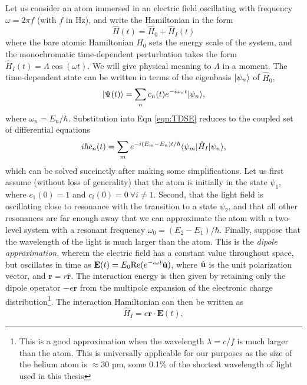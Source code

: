	Let us consider an atom immersed in an electric field oscillating with frequency $\omega = 2 \pi f$ (with $f$ in Hz), and write the Hamiltonian in the form
	\begin{equation}
		\hat{H}(t) = \hat{H}_0 + \hat{H}_{I}(t)
	\end{equation}
	where the bare atomic Hamiltonian $H_0$ sets the energy scale of the system, and the monochromatic time-dependent perturbation takes the form $\hat{H}_I(t) = \Lambda \cos(\omega t)$.
	We will give physical meaning to $\Lambda$ in a moment.
	The time-dependent state can be written in terms of the eigenbasis $|\psi_n\rangle$ of $\hat{H}_0$,
	\begin{equation}
		|\Psi(t)\rangle = \sum_n c_n(t)e^{-i\omega_n t}|\psi_n\rangle,
	\end{equation}
	where $\omega_n= E_n/\hbar$.
	Substitution into Eqn \ref{eqn:TDSE} reduces to the coupled set of differential equations 
	\begin{equation}
		i\hbar\dot{c}_n(t) = \sum_m e^{-i(E_m-E_n)t/\hbar}\langle\psi_m|\hat{H}_I|\psi_n\rangle,
	\end{equation} 
	which can be solved succinctly after making some simplifications.
	Let us first assume (without loss of generality) that the atom is initially in the state $\psi_1$, where $c_1(0)=1$ and $c_i(0)=0~\forall i\neq1$.
	Second, that the light field is oscillating close to resonance with the transition to a state $\psi_2$, and that all other resonances are far enough away that we can approximate the atom with a two-level system with a resonant frequency $\omega_0 =(E_2-E_1)/\hbar$.
	Finally, suppose that the wavelength of the light is much larger than the atom. 
	This is the \emph{dipole approximation}, wherein the electric field has a constant value throughout space, but oscillates in time as $\textbf{E}(t) = {E}_0 \textrm{Re}(e^{-i\omega t}\hat{\mathbf{u}})$, where $\hat{\mathbf{u}}$ is the unit polarization vector, and $\textbf{r} = r\hat{\textbf{r}}$.
	The interaction energy is then given by retaining only the dipole operator $-e\textbf{r}$ from the multipole expansion of the electronic charge distribution\footnote{This is a good approximation when the wavelength $\lambda = c/f$ is much larger than the atom. This is universally applicable for our purposes as the size of the helium atom is $\approx 30$ pm, some 0.1\% of the shortest wavelength of light used in this thesis}.
	The interaction Hamiltonian can then be written as
	\begin{equation}
		\hat{H}_I = e\textbf{r}\cdot\textbf{E}(t),
	\end{equation}

